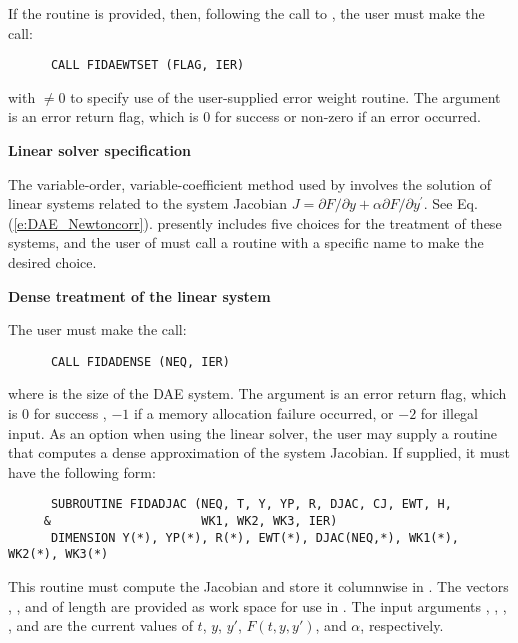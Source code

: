 \begin{Steps}
  If the  routine is provided, then, 
  following the call to , the user must make the call:
\begin{verbatim}
      CALL FIDAEWTSET (FLAG, IER)
\end{verbatim}
  with  $\neq 0$ to specify use of the user-supplied error weight routine.
  The argument  is an error return flag, which is $0$ 
  for success or non-zero if an error occurred.

\item\label{i:fida_lin_solv_spec} {\bf Linear solver specification} 
  
  The variable-order, variable-coefficient  method used by {\ida} involves
  the solution of linear systems related to the system Jacobian
  $J = \partial F / \partial y + \alpha \partial F / \partial y^\prime$.
  See Eq. (\ref{e:DAE_Newtoncorr}).  {\ida} presently includes five choices for
  the treatment of these systems, and the user of {\fida} must call a routine with
  a specific name to make the desired choice.


  {\s} {\bf Dense treatment of the linear system}
  
  The user must make the call:
\begin{verbatim}
      CALL FIDADENSE (NEQ, IER)
\end{verbatim}
  where  is the size of the DAE system.
  The argument  is an error return flag, which is $0$ 
  for success , $-1$ if a memory allocation failure occurred, or $-2$ for illegal
  input.  
  As an option when using the {\dense} linear solver, the user may supply a
  routine that computes a dense approximation of the system Jacobian. If supplied,
  it must have the following form:
\begin{verbatim}
      SUBROUTINE FIDADJAC (NEQ, T, Y, YP, R, DJAC, CJ, EWT, H,
     &                     WK1, WK2, WK3, IER)
      DIMENSION Y(*), YP(*), R(*), EWT(*), DJAC(NEQ,*), WK1(*), WK2(*), WK3(*)
\end{verbatim}
  This routine must compute the Jacobian and store it columnwise in .
  The vectors , , and  of length  are provided
  as work space for use in .
  The input arguments , , , , and  are the
  current values of $t$, $y$, $y'$, $F(t,y,y')$, and $\alpha$, respectively.
  

\end{Steps}

